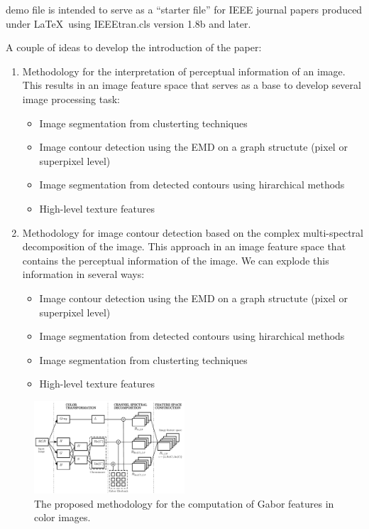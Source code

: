 \documentclass[journal]{IEEEtran}
\begin{document}
 demo file is intended to serve as a ``starter file''
for IEEE journal papers produced under \LaTeX\ using
IEEEtran.cls version 1.8b and later.

A couple of ideas to develop the introduction of the paper:
\begin{enumerate}
	\item Methodology for the interpretation of perceptual information of an image. This results in an image feature space that serves as a base to develop several image processing task:
	\begin{itemize}
		\item Image segmentation from clusterting techniques
		\item Image contour detection using the EMD on a graph structute (pixel or superpixel level)
		\item Image segmentation from detected contours using hirarchical methods
		\item High-level texture features
	\end{itemize}	 
	
	\item Methodology for image contour detection based on the complex multi-spectral decomposition of the image. This approach in an image feature space that contains the perceptual information of the image. We can explode this information in several ways:
	\begin{itemize}
		\item Image contour detection using the EMD on a graph structute (pixel or superpixel level)
		\item Image segmentation from detected contours using hirarchical methods
		\item Image segmentation from clusterting techniques
		\item High-level texture features
	\end{itemize}	
\end{enumerate}


\begin{figure}[!ht]
	\centering
	\includegraphics[width=0.5\textwidth]{gabor_color_feature_extraction_diagram}
	\caption{The proposed methodology for the computation of Gabor features in color images.}\label{fig:proposed_pipeline_gabor_feature_extraction}
\end{figure}
\end{document}
